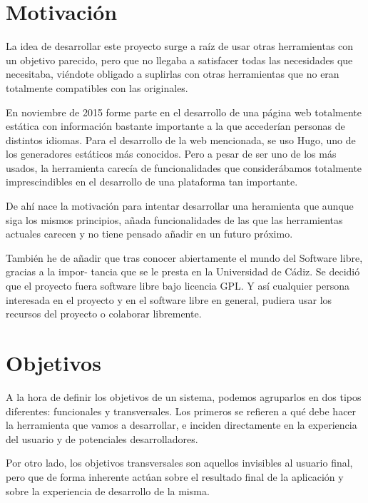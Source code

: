 \section{Motivación}

La idea de desarrollar este proyecto surge a raíz de usar otras herramientas con un objetivo
parecido, pero que no llegaba a satisfacer todas las necesidades que necesitaba, viéndote obligado
a suplirlas con otras herramientas que no eran totalmente compatibles con las originales.

En noviembre de 2015 forme parte en el desarrollo de una página web totalmente estática con información
bastante importante a la que accederían personas de distintos idiomas. Para el desarrollo de la web mencionada,
se uso Hugo, uno de los generadores estáticos más conocidos. Pero a pesar de ser uno de los más usados,
la herramienta carecía de funcionalidades que considerábamos totalmente imprescindibles en el desarrollo
de una plataforma tan importante.

De ahí nace la motivación para intentar desarrollar una heramienta que aunque siga los mismos principios,
añada funcionalidades de las que las herramientas actuales carecen y no tiene pensado añadir en un futuro
próximo.

También he de añadir que tras conocer abiertamente el mundo del Software libre, gracias a la impor-
tancia que se le presta en la Universidad de Cádiz. Se decidió que el proyecto fuera software libre bajo
licencia GPL. Y así cualquier persona interesada en el proyecto y en el software libre
en general, pudiera usar los recursos del proyecto o colaborar libremente.

\section{Objetivos}

A la hora de definir los objetivos de un sistema, podemos agruparlos en dos tipos
diferentes: funcionales y transversales. Los primeros se refieren a qué debe hacer
la herramienta que vamos a desarrollar, e inciden directamente en la experiencia del
usuario y de potenciales desarrolladores.

Por otro lado, los objetivos transversales son aquellos invisibles al usuario final,
pero que de forma inherente actúan sobre el resultado final de la aplicación y
sobre la experiencia de desarrollo de la misma.

